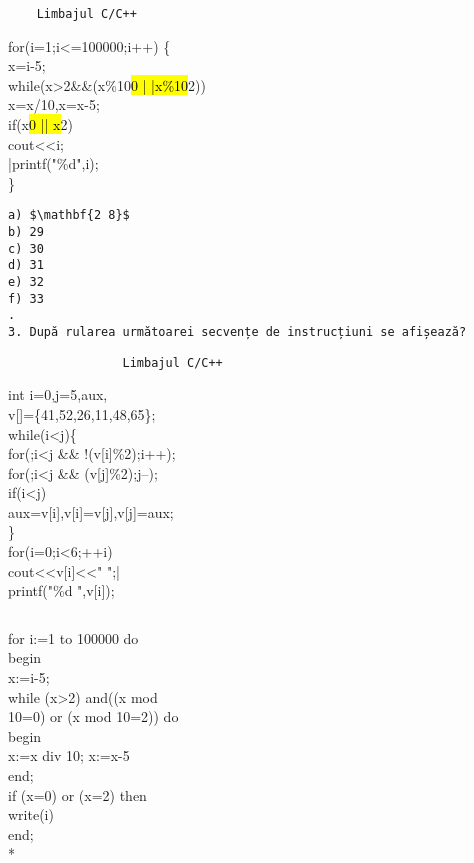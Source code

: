 \begin{verbatim}
    Limbajul C/C++
\end{verbatim}

for(i=1;i<=100000;i++) \{\\
x=i-5;\\
while(x>2\&\&(x\%10\hl{0 | |x\%10}2))\\
x=x/10,x=x-5;\\
if(x\hl{0 || x}2)\\
cout<<i;\\
|printf("\%d",i);\\
\}

\begin{verbatim}
a) $\mathbf{2 8}$
b) 29
c) 30
d) 31
e) 32
f) 33
.
3. După rularea următoarei secvențe de instrucțiuni se afișează?
\end{verbatim}

\begin{verbatim}
                Limbajul C/C++
\end{verbatim}

int i=0,j=5,aux,\\[0pt]
v[]=\{41,52,26,11,48,65\};\\
while(i<j)\{\\[0pt]
for(;i<j \&\& !(v[i]\%2);i++);\\[0pt]
for(;i<j \&\& (v[j]\%2);j--);\\
if(i<j)\\[0pt]
aux=v[i],v[i]=v[j],v[j]=aux;\\
\}\\
for(i=0;i<6;++i)\\[0pt]
cout<<v[i]<<" ";|\\[0pt]
printf("\%d ",v[i]);

\begin{verbatim}

\end{verbatim}

for i:=1 to 100000 do\\
begin\\
x:=i-5;\\
while (x>2) and((x mod\\
10=0) or (x mod 10=2)) do\\
begin\\
x:=x div 10; x:=x-5\\
end;\\
if (x=0) or (x=2) then\\
write(i)\\
end;\\
*

